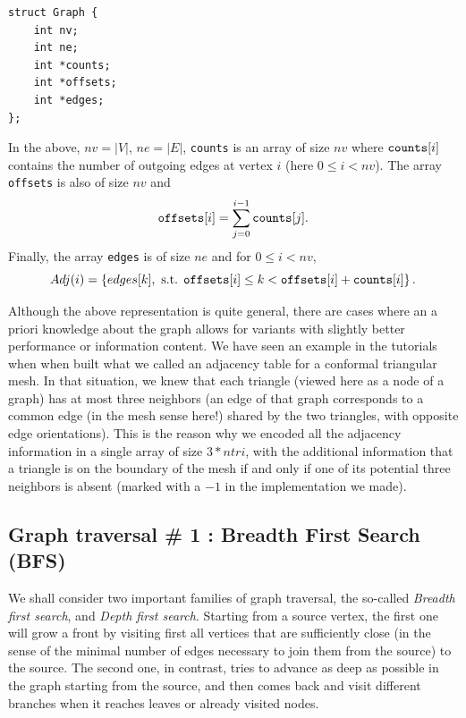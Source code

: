 \documentclass[12pt]{article}
\theoremstyle{plain}
\theoremstyle{remark}
\begin{document}
\begin{lstlisting}[style=C]
struct Graph {
	int nv;
	int ne;
	int *counts;
	int *offsets;
	int *edges;
};
\end{lstlisting}
In the above, $nv = |V|$, $ne=|E|$, {\tt counts} is an array of size $nv$ where
${\tt counts}[i]$ contains the number of outgoing edges at vertex $i$ (here $0 \leq i
< nv$). The array {\tt offsets} is also of size $nv$ and $${\tt offsets}[i] =
\sum_{j=0}^{i-1}{\tt counts}[j].$$ Finally, the array {\tt edges} is of size $ne$ and 
for $0 \leq i < nv,$
$$
Adj(i) = \left\{ edges[k],\text{ s.t. } {\tt offsets}[i] \leq k < {\tt offsets}[i] +
{\tt counts}[i]\right\}.
$$

\medskip
Although the above representation is quite general, there are cases where an a
priori knowledge about the graph allows for variants with slightly better
performance or information content. We have seen an example in the tutorials
when when built what we called an adjacency table for a conformal triangular
mesh. In that situation, we knew that each triangle (viewed here as a node of a 
graph) has at most three neighbors (an edge of that graph corresponds to 
a common edge (in the mesh sense here!) shared by the two triangles, with opposite 
edge orientations). This is the reason why we encoded all the adjacency
information in a single array of size $3 * ntri$, with the additional
information that a triangle is on the boundary of the mesh if and only if one of
its potential three neighbors is absent (marked with a $-1$ in the 
implementation we made).


\subsection{Graph traversal \# 1 : Breadth First Search (BFS)}

We shall consider two important families of graph traversal, the so-called {\it
Breadth first search}, and {\it Depth first search}. Starting from a source
vertex, the first one will grow a front by visiting first all vertices that are
sufficiently close (in the sense of the minimal number of edges necessary to
join them from the source) to the source. The second one, in contrast, tries to 
advance as deep as possible in the graph starting from the source, and then
comes back and visit different branches when it reaches leaves or already
visited nodes. 
\end{document}
